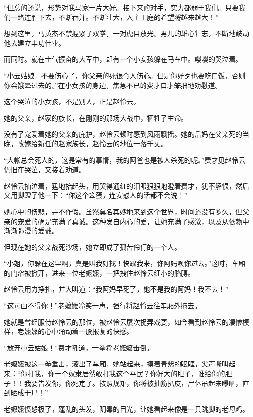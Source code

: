 \begin{this_body}
“但总的还说，形势对我马家一片大好。接下来的对手，实力都弱于我们。只要我们一路连胜下去，不断吞并。不断壮大，入主王庭的希望将越来越大！”

想到这里，马英杰不禁握紧了双拳，一对虎目放光。男儿的雄心壮志，不断地鼓动他去建立丰功伟业。

而同时。就在士气振奋的大军中，却有一个小女孩躲在马车中。嘤嘤的哭泣着。

“小云姑娘，不要伤心了，你父亲的死很令人伤心。但是你好歹也要吃口饭，否则你会饿晕过去的。”在小女孩的身边，焦急不已的费才口才笨拙地劝慰道。

这个哭泣的小女孩，不是别人，正是赵怜云。

她的父亲，赵家的族长，在刚刚的那场大战中，牺牲了生命。

没有了宠爱着她的父亲的庇护，赵怜云顿时感到风雨飘摇。她的后妈在父亲死的当晚，改嫁给新任的赵家族长，赵怜云的地位一落千丈。

“大帐总会死人的，这是常有的事情，我的阿爸也是被人杀死的呢。”费才见赵怜云仍旧在哭泣，又接着劝道。

赵怜云抽泣着，猛地抬起头，用哭得通红的泪眼狠狠地瞪着费才，犹不解恨，然后又用脚蹬了他一下：“你这个笨蛋，连安慰人的话都不会说！”

她心中的伤悲，并不作假。虽然莫名其妙地来到这个世界，时间还没有多久，但父亲的宠爱的确是充满了真诚。这种发自内心的爱，让她充满了感激，以及从依赖中渐渐弥漫的爱戴。

但现在她的父亲战死沙场，她立即成了孤苦伶仃的一个人。

“小姐，你躲在这里啊，真是叫我好找！快跟我来，你阿妈唤你过去。”这时，车厢的门帘被掀开，进来一位老嬷嬷，一把拽住赵怜云细小的胳膊。

赵怜云用力挣扎，并大叫道：“我阿妈早死了，她不是我的阿妈！我不去！”

“这可由不得你！”老嬷嬷冷笑一声，强行将赵怜云往车厢外拖去。

她就是曾经服侍赵怜云的那位，被赵怜云屡次捉弄戏耍，如今看到赵怜云的凄惨模样，老嬷嬷的心中涌动着一股报复的快感。

“放开小云姑娘！”费才吼道，一拳将老嬷嬷击倒。

老嬷嬷被这一拳重击，滚出了车厢，她站起来，摸着青紫的眼眶，尖声嘶叫起来：“你打我，你一个奴隶居然敢打我这个平民？你好大的胆子，谁给你的胆子！！我要告发你，你死定了。按照规矩，你将被抽筋扒皮，尸体吊起来曝晒，直到晒成干尸！”

老嬷嬷愤怒极了，蓬乱的头发，阴毒的目光，让她看起来像是一只跳脚的老母鸡。


\end{this_body}

